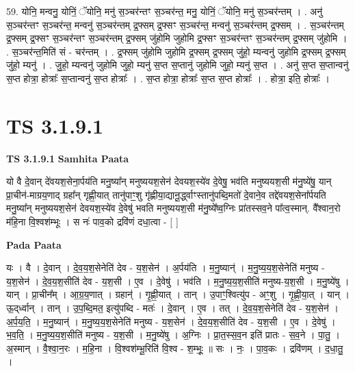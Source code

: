 \documentclass[17pt]{extarticle}
\begin{document}
59. योनि॒ मन्वनु॒ योनिं॒ ॅयोनि॒ मनु॑ स॒ञ्चर॑न्तꣳ स॒ञ्चर॑न्त॒ मनु॒ योनिं॒ ॅयोनि॒ मनु॑ स॒ञ्चर॑न्तम् । . अनु॑ स॒ञ्चर॑न्तꣳ स॒ञ्चर॑न्त॒ मन्वनु॑ स॒ञ्चर॑न्तम् द्र॒फ्सम् द्र॒फ्सꣳ स॒ञ्चर॑न्त॒ मन्वनु॑ स॒ञ्चर॑न्तम् द्र॒फ्सम् । . स॒ञ्चर॑न्तम् द्र॒फ्सम् द्र॒फ्सꣳ स॒ञ्चर॑न्तꣳ स॒ञ्चर॑न्तम् द्र॒फ्सम् जु॑होमि जुहोमि द्र॒फ्सꣳ स॒ञ्चर॑न्तꣳ स॒ञ्चर॑न्तम् द्र॒फ्सम् जु॑होमि । . स॒ञ्चर॑न्त॒मिति॑ सं - चर॑न्तम् । . द्र॒फ्सम् जु॑होमि जुहोमि द्र॒फ्सम् द्र॒फ्सम् जु॑हो॒ म्यन्वनु॑ जुहोमि द्र॒फ्सम् द्र॒फ्सम् जु॑हो॒ म्यनु॑ । . जु॒हो॒ म्यन्वनु॑ जुहोमि जुहो॒ म्यनु॑ स॒प्त स॒प्तानु॑ जुहोमि जुहो॒ म्यनु॑ स॒प्त । . अनु॑ स॒प्त स॒प्तान्वनु॑ स॒प्त होत्रा॒ होत्राः᳚ स॒प्तान्वनु॑ स॒प्त होत्राः᳚ । . स॒प्त होत्रा॒ होत्राः᳚ स॒प्त स॒प्त होत्राः᳚ । . होत्रा॒ इति॒ होत्राः᳚ । \newline
\pagebreak
{}

\section{ TS 3.1.9.1 }

\textbf{TS 3.1.9.1 } \newline
\textbf{Samhita Paata} \newline

यो वै दे॒वान् दे॑वयश॒सेना॒र्पय॑ति मनु॒ष्या᳚न् मनुष्ययश॒सेन॑ देवयश॒स्ये॑व दे॒वेषु॒ भव॑ति मनुष्ययश॒सी म॑नु॒ष्ये॑षु॒ यान् प्रा॒चीन॑-माग्रय॒णाद् ग्रहा᳚न् गृह्णी॒यात् तानु॑पाꣳ॒॒शु गृ॑ह्णीया॒द्यानू॒र्द्ध्वाꣳस्तानु॑पब्दि॒मतो॑ दे॒वाने॒व तद्दे॑वयश॒सेना᳚र्पयति मनु॒ष्या᳚न् मनुष्ययश॒सेन॑ देवयश॒स्ये॑व दे॒वेषु॑ भवति मनुष्ययश॒सी म॑नु॒ष्ये᳚ष्व॒ग्निः प्रा॑तस्सव॒ने पा᳚त्व॒स्मान्. वै᳚श्वान॒रो म॑हि॒ना वि॒श्वश॑म्भूः । स नः॑ पाव॒को द्रवि॑णं दधा॒त्वा - [  ] \newline

\textbf{Pada Paata} \newline

यः । वै । दे॒वान् । दे॒व॒य॒श॒सेनेति॑ देव - य॒श॒सेन॑ । अ॒र्पय॑ति । म॒नु॒ष्यान्॑ । म॒नु॒ष्य॒य॒श॒सेनेति॑ मनुष्य - य॒श॒सेन॑ । दे॒व॒य॒श॒सीति॑ देव - य॒श॒सी । ए॒व । दे॒वेषु॑ । भव॑ति । म॒नु॒ष्य॒य॒श॒सीति॑ मनुष्य-य॒श॒सी । म॒नु॒ष्ये॑षु । यान् । प्रा॒चीन᳚म् । आ॒ग्र॒य॒णात् । ग्रहान्॑ । गृ॒ह्णी॒यात् । तान् । उ॒पाꣳ॒॒श्वित्यु॑प - अꣳ॒॒शु । गृ॒ह्णी॒या॒त् । यान् । ऊ॒द्‌र्ध्वान् । तान् । उ॒प॒ब्दि॒मत॒ इत्यु॑पब्दि - मतः॑ । दे॒वान् । ए॒व । तत् । दे॒व॒य॒श॒सेनेति॑ देव - य॒श॒सेन॑ । अ॒र्प॒य॒ति॒ । म॒नु॒ष्यान्॑ । म॒नु॒ष्य॒य॒श॒सेनेति॑ मनुष्य - य॒श॒सेन॑ । दे॒व॒य॒श॒सीति॑ देव - य॒श॒सी । ए॒व । दे॒वेषु॑ । भ॒व॒ति॒ । म॒नु॒ष्य॒य॒श॒सीति॑ मनुष्य - य॒श॒सी । म॒नु॒ष्ये॑षु । अ॒ग्निः । प्रा॒त॒स्स॒व॒न इति॑ प्रातः - स॒व॒ने । पा॒तु॒ ।अ॒स्मान् । वै॒श्वा॒न॒रः । म॒हि॒ना । वि॒श्वश॑म्भू॒रिति॑ वि॒श्व - श॒म्भूः॒ ॥ सः । नः॒ । पा॒व॒कः । द्रवि॑णम् । द॒धा॒तु॒ ।  \newline
\end{document}

